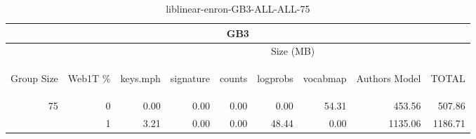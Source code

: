 \begin{center}
\begin{table}[htbp] 
 \begin{center}
\begin{tabular}{ | r | r | r | r | r | r | r | r | r |}
\hline
\multicolumn{9}{|c|}{GB3}\\
\hline
 & & \multicolumn{7}{|c|}{Size (MB)}\\ \cline{3-9}
\begin{sideways}Group Size\end{sideways} & \begin{sideways}Web1T \% \end{sideways} & \begin{sideways}keys.mph\end{sideways} & \begin{sideways}signature\end{sideways} & \begin{sideways}counts\end{sideways} & \begin{sideways}logprobs\end{sideways} & \begin{sideways}vocabmap\end{sideways} & \begin{sideways}Authors Model \end{sideways} & \begin{sideways}TOTAL\end{sideways}\\
\hline
\multirow{1}{*}{75}
 & 0 & 0.00 & 0.00 & 0.00 & 0.00 & 54.31 & 453.56 & 507.86\\ \cline{2-9}
 & 1 & 3.21 & 0.00 & 0.00 & 48.44 & 0.00 & 1135.06 & 1186.71\\ \cline{2-9}
\hline
\end{tabular}
\caption{liblinear-enron-GB3-ALL-ALL-75}
\label{table:liblinear-enron-GB3-ALL-ALL-75}
\end{center}
 \end{table}
\end{center}

